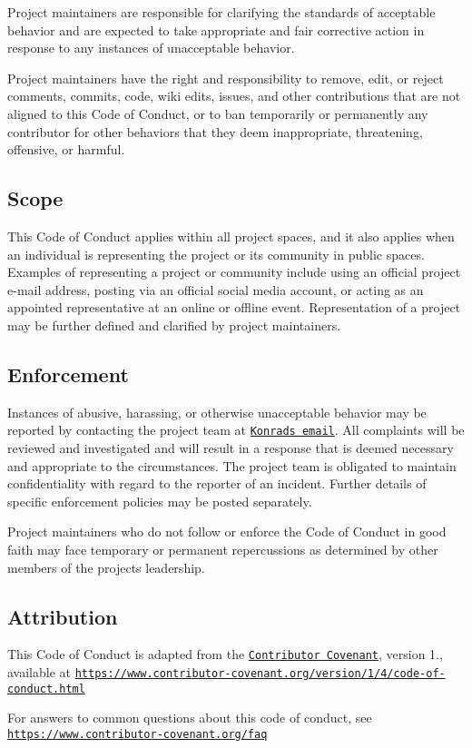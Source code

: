 Project maintainers are responsible for clarifying the standards of acceptable behavior and are expected to take appropriate and fair corrective action in response to any instances of unacceptable behavior.

Project maintainers have the right and responsibility to remove, edit, or reject comments, commits, code, wiki edits, issues, and other contributions that are not aligned to this Code of Conduct, or to ban temporarily or permanently any contributor for other behaviors that they deem inappropriate, threatening, offensive, or harmful.

\subsection*{Scope}

This Code of Conduct applies within all project spaces, and it also applies when an individual is representing the project or its community in public spaces. Examples of representing a project or community include using an official project e-\/mail address, posting via an official social media account, or acting as an appointed representative at an online or offline event. Representation of a project may be further defined and clarified by project maintainers.

\subsection*{Enforcement}

Instances of abusive, harassing, or otherwise unacceptable behavior may be reported by contacting the project team at \href{konradwerys2@gmail.com}{\tt Konrad\textquotesingle{}s email}. All complaints will be reviewed and investigated and will result in a response that is deemed necessary and appropriate to the circumstances. The project team is obligated to maintain confidentiality with regard to the reporter of an incident. Further details of specific enforcement policies may be posted separately.

Project maintainers who do not follow or enforce the Code of Conduct in good faith may face temporary or permanent repercussions as determined by other members of the project\textquotesingle{}s leadership.

\subsection*{Attribution}

This Code of Conduct is adapted from the \href{https://www.contributor-covenant.org>}{\tt Contributor Covenant}, version 1., available at \href{https://www.contributor-covenant.org/version/1/4/code-of-conduct.html}{\tt https\+://www.\+contributor-\/covenant.\+org/version/1/4/code-\/of-\/conduct.\+html}

For answers to common questions about this code of conduct, see \href{https://www.contributor-covenant.org/faq}{\tt https\+://www.\+contributor-\/covenant.\+org/faq} 